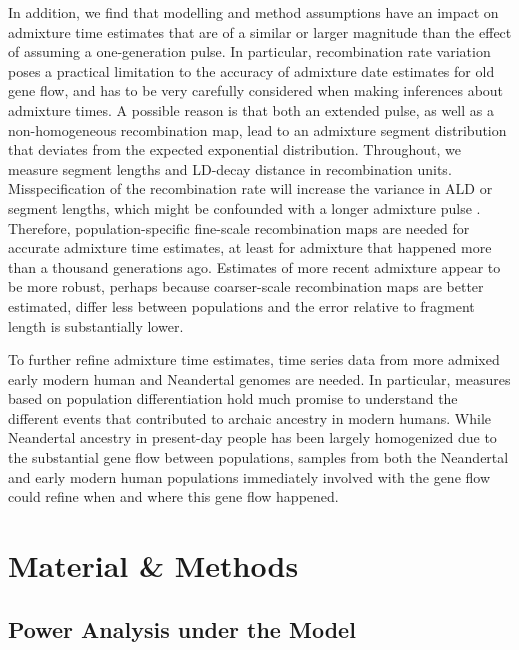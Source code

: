 \documentclass[11pt]{article}
\begin{document}
In addition, we find that modelling and method assumptions have an impact on admixture time estimates that are of a similar or larger magnitude than the effect of assuming a one-generation pulse. In particular, recombination rate variation poses a practical limitation to the accuracy of admixture date estimates for old gene flow, and has to be very carefully considered when making inferences about admixture times. A possible reason is that both an extended pulse, as well as a non-homogeneous recombination map, lead to an admixture segment distribution that deviates from the expected exponential distribution. Throughout, we measure segment lengths and LD-decay distance in recombination units. Misspecification of the recombination rate will increase the variance in ALD or segment lengths, which might be confounded with a longer admixture pulse \citep{sankararaman_date_2012}. Therefore, population-specific fine-scale recombination maps are needed for accurate admixture time estimates, at least for admixture that happened more than a thousand generations ago. Estimates of more recent admixture appear to be more robust, perhaps because coarser-scale recombination maps are better estimated, differ less between populations \citep{hinch_landscape_2011} and the error relative to fragment length is substantially lower. 

To further refine admixture time estimates, time series data from more admixed early modern human and Neandertal genomes are needed. In particular, measures based on population differentiation  \citep[e.g][]{wall_higher_2013,browning_analysis_2018,villanea_multiple_2019} hold much promise to understand the different events that contributed to archaic ancestry in modern humans. While Neandertal ancestry in present-day people has been largely homogenized due to the substantial gene flow between populations, samples from both the Neandertal and early modern human populations immediately involved with the gene flow could refine when and where this gene flow happened. 


\section{Material \& Methods}\label{methods}

\subsection{Power Analysis under the Model}\label{power analysis}
\end{document}
